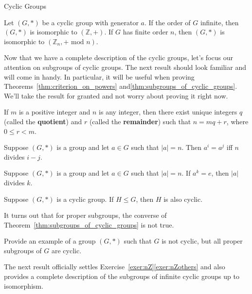 \begin{section}{Cyclic Groups}
\begin{theorem}
Let $(G,*)$ be a cyclic group with generator $a$. If the order of $G$ infinite, then $(G,*)$ is isomorphic to $(\mathbb{Z},+)$. If $G$ has finite order $n$, then $(G,*)$ is isomorphic to $(\mathbb{Z}_n,+\text{ mod }n)$.
\end{theorem}

Now that we have a complete description of the cyclic groups, let's focus our attention on subgroups of cyclic groups.  The next result should look familiar and will come in handy.  In particular, it will be useful when proving Theorems~\ref{thm:criterion_on_powers} and\ref{thm:subgroups_of_cyclic_groups}.  We'll take the result for granted and not worry about proving it right now.

\begin{theorem}
If $m$ is a positive integer and $n$ is any integer, then there exist unique integers $q$ (called the \textbf{quotient}) and $r$ (called the \textbf{remainder}) such that $n=mq+r$, where $0\leq r<m$.
\end{theorem}

\begin{theorem}\label{thm:criterion_on_powers}
Suppose $(G,*)$ is a group and let $a\in G$ such that $|a|=n$.  Then $a^i=a^j$ iff $n$ divides $i-j$.
\end{theorem}

\begin{corollary}
Suppose $(G,*)$ is a group and let $a\in G$ such that $|a|=n$.  If $a^k=e$, then $|a|$ divides $k$.
\end{corollary}

\begin{theorem}\label{thm:subgroups_of_cyclic_groups}
Suppose $(G,*)$ is a cyclic group. If $H\leq G$, then $H$ is also cyclic.
\end{theorem}

It turns out that for proper subgroups, the converse of Theorem~\ref{thm:subgroups_of_cyclic_groups} is not true.

\begin{exercise}
Provide an example of a group $(G,*)$ such that $G$ is not cyclic, but all proper subgroups of $G$ are cyclic.
\end{exercise}

The next result officially settles Exercise~\ref{exer:nZ}\ref{exer:nZothers} and also provides a complete description of the subgroups of infinite cyclic groups up to isomorphism.


\end{section}
